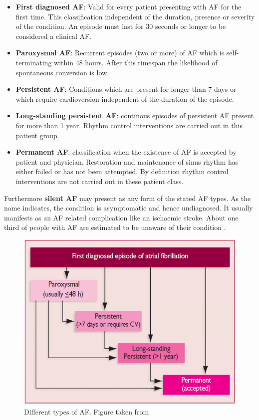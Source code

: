 \documentclass[type=dr, dr=rernat, accentcolor=tud7b,colorbacktitle, bigchapter, openright, twoside, 12pt ]{tudthesis}
\begin{document}
\begin{itemize} 
 \item[] \textbf{First diagnosed AF}: Valid for every patient presenting with AF for the first time. This classification independent of the duration, presence or severity of the condition. An episode must last for 30 seconds or longer to be considered a clinical AF.
 \item[] \textbf{Paroxysmal AF}: Recurrent episodes (two or more) of AF which is self-terminating within 48 hours. After this timespan the likelihood of spontaneous conversion is low.
 \item[] \textbf{Persistent AF}: Conditions which are present for longer than 7 days or which require cardioversion independent of the duration of the episode. 
 \item[] \textbf{Long-standing persistent AF}: continous episodes of persistent AF present for more than 1 year. Rhythm control interventions  are carried out in this patient group. 
 \item[] \textbf{Permanent AF}: classification when the existence of AF is accepted by patient and physician. Restoration and maintenance of sinus rhythm has either failed or has not been attempted. By definition rhythm control interventions are not carried out in these patient class.  
\end{itemize}

Furthermore \textbf{silent AF} may present as any form of the stated AF types. As the name indicates, the condition is asymptomatic and hence undiagnosed. It usually manifests as an AF related complication like an ischaemic stroke. About one third of people with AF are estimated to be unaware of their condition \cite{ESC10}.

\begin{figure}[H]
\begin{center}
\includegraphics[scale=0.25]{af_types.png}
\caption{Different types of AF. Figure taken from \cite{ESC10}}
\label{ecg}
\end{center}
\end{figure}
\end{document}
